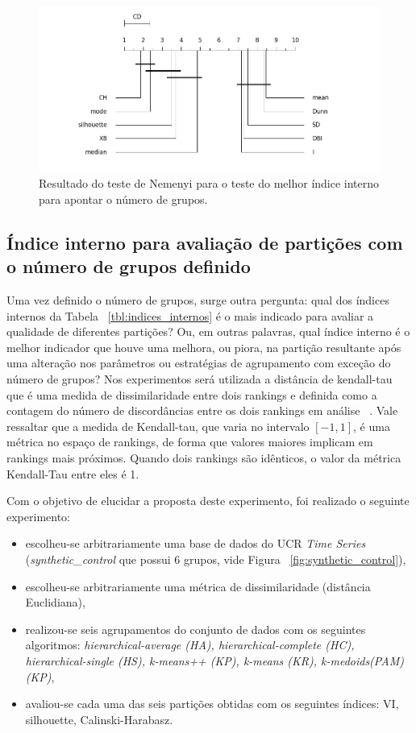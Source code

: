  \begin{figure}[h!]
 		\includegraphics[width=\linewidth]{figuras/figura_alteracao_centroid.png}
 	\caption{Resultado do teste de Nemenyi para o teste do melhor índice interno para apontar o número de grupos.}
 	 	\label{fig:resultado_iterativo}
 \end{figure} 


\subsection{Índice interno para avaliação de partições com o número de grupos definido} \label{sec:indice_interno_k_fixo}

Uma vez definido o número de grupos, surge outra pergunta: qual dos índices internos da Tabela ~\ref{tbl:indices_internos} é o mais indicado para avaliar a qualidade de diferentes partições? Ou, em outras palavras, qual índice interno é o melhor indicador que houve uma melhora, ou piora, na partição resultante após uma alteração nos parâmetros ou estratégias de agrupamento com exceção do número de grupos? Nos experimentos será utilizada a distância de kendall-tau que é uma medida de dissimilaridade entre dois rankings e definida como a contagem do número de discordâncias entre os dois rankings em análise ~\parencite{kendall_tau}. Vale ressaltar que a medida de Kendall-tau, que varia no intervalo $[-1,1]$, é uma métrica no espaço de rankings, de forma que valores maiores implicam em rankings mais próximos. Quando dois rankings são idênticos, o valor da métrica Kendall-Tau entre eles é 1.

Com o objetivo de elucidar a proposta deste experimento, foi realizado o seguinte experimento:
\begin{itemize}
	\item escolheu-se arbitrariamente uma base de dados do UCR \emph{Time Series} (\emph{synthetic_control} que possui 6 grupos, vide Figura ~\ref{fig:synthetic_control}),
	\item escolheu-se arbitrariamente uma métrica de dissimilaridade (distância Euclidiana),
	\item realizou-se seis agrupamentos do conjunto de dados com os seguintes algoritmos: \emph{hierarchical-average (HA), hierarchical-complete (HC), hierarchical-single (HS), k-means++ (KP), k-means (KR), k-medoids(PAM)(KP)},
	\item avaliou-se cada uma das seis partições obtidas com os seguintes índices: VI, silhouette, Calinski-Harabasz.
\end{itemize}

